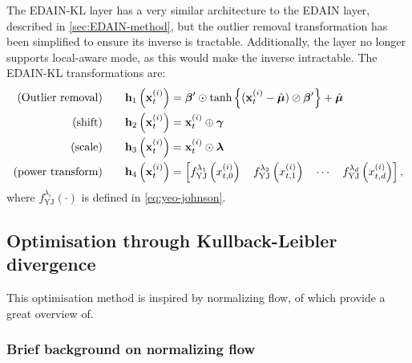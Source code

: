 \documentclass{statsmsc}
\begin{document}
The \ac{EDAIN-KL} layer has a very similar architecture to the \ac{EDAIN} layer, described in
\cref{sec:EDAIN-method}, but the outlier removal transformation has been simplified to ensure its
inverse is tractable. Additionally, the layer no longer supports local-aware mode, as this
would make the inverse intractable. The \ac{EDAIN-KL} transformations are:
\begin{align}
    \textrm{(Outlier removal)} \qquad& \mathbf{h}_1\left(\mathbf{x}^{(i)}_t\right)=\bm\beta' \odot \tanh\left\{(\mathbf{x}^{(i)}_t - \hat{\bm\mu}) \oslash \bm\beta' \right\}+\hat{\bm\mu} \label{eq:kl1}\\
    \textrm{(shift)} \qquad& \mathbf{h}_2\left(\mathbf{x}^{(i)}_t\right)=\mathbf{x}^{(i)}_t\oplus \bm\gamma \label{eq:kl2}\\
    \textrm{(scale)} \qquad& \mathbf{h}_3\left(\mathbf{x}^{(i)}_t\right)=\mathbf{x}^{(i)}_t \odot \bm\lambda  \label{eq:kl3}\\
    \textrm{(power transform)} \qquad& \mathbf{h}_4\left(\mathbf{x}^{(i)}_t\right)=\left[
        f^{\lambda_1}_{\textrm{YJ}}\left(x^{(i)}_{t,0}\right)
        \quad f^{\lambda_2}_{\textrm{YJ}}\left(x^{(i)}_{t,1}\right)
        \quad \cdots
        \quad f^{\lambda_d}_{\textrm{YJ}}\left(x^{(i)}_{t,d}\right)
    \right], \label{eq:kl4}
\end{align}
where $f^{\lambda_i}_{\textrm{YJ}}(\cdot)$ is defined in \cref{eq:yeo-johnson}.

\subsection{Optimisation through Kullback-Leibler divergence}%
\label{sub:Optimisation through Kullback-Leibler divergence}

This optimisation method is inspired by normalizing flow, of which \citeauthor{normalizing_flows}
provide a great overview of. 

\subsubsection{Brief background on normalizing flow}%
\label{ssub:Brief background on normalizing flow}
\end{document}

